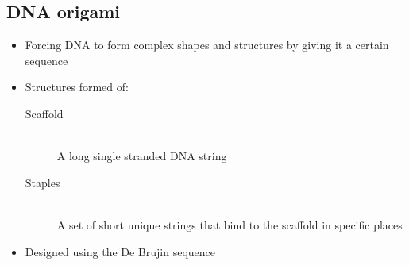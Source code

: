 \documentclass[a4paper]{article}
\begin{document}
\subsection{DNA origami}

\begin{itemize}
  \item Forcing DNA to form complex shapes and structures by giving it a certain
        sequence
  \item Structures formed of:
    \begin{description}
      \item[Scaffold] \hfill \\
        A long single stranded DNA string
      \item[Staples] \hfill \\
        A set of short unique strings that bind to the scaffold in specific
        places
    \end{description}
  \item Designed using the De Brujin sequence
\end{itemize}
\end{document}
